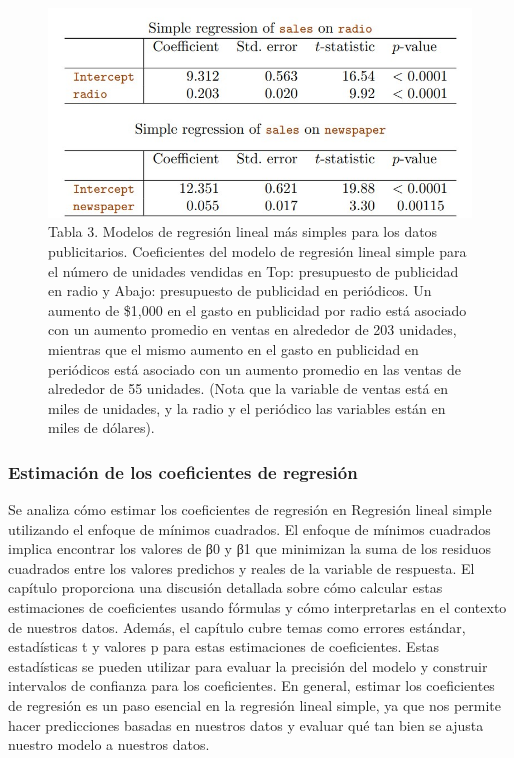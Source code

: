\documentclass[
  letterpaper,
  DIV=11,
  numbers=noendperiod]{scrartcl}
\begin{document}
\begin{figure}

{\centering \includegraphics{images/tbl 3.jpg}

}

\caption{Tabla 3. Modelos de regresión lineal más simples para los datos
publicitarios. Coeficientes del modelo de regresión lineal simple para
el número de unidades vendidas en Top: presupuesto de publicidad en
radio y Abajo: presupuesto de publicidad en periódicos. Un aumento de
\$1,000 en el gasto en publicidad por radio está asociado con un aumento
promedio en ventas en alrededor de 203 unidades, mientras que el mismo
aumento en el gasto en publicidad en periódicos está asociado con un
aumento promedio en las ventas de alrededor de 55 unidades. (Nota que la
variable de ventas está en miles de unidades, y la radio y el periódico
las variables están en miles de dólares).}

\end{figure}

\hypertarget{estimaciuxf3n-de-los-coeficientes-de-regresiuxf3n}{%
\subsubsection{Estimación de los coeficientes de
regresión}\label{estimaciuxf3n-de-los-coeficientes-de-regresiuxf3n}}

Se analiza cómo estimar los coeficientes de regresión en Regresión
lineal simple utilizando el enfoque de mínimos cuadrados. El enfoque de
mínimos cuadrados implica encontrar los valores de β0 y β1 que minimizan
la suma de los residuos cuadrados entre los valores predichos y reales
de la variable de respuesta. El capítulo proporciona una discusión
detallada sobre cómo calcular estas estimaciones de coeficientes usando
fórmulas y cómo interpretarlas en el contexto de nuestros datos. Además,
el capítulo cubre temas como errores estándar, estadísticas t y valores
p para estas estimaciones de coeficientes. Estas estadísticas se pueden
utilizar para evaluar la precisión del modelo y construir intervalos de
confianza para los coeficientes. En general, estimar los coeficientes de
regresión es un paso esencial en la regresión lineal simple, ya que nos
permite hacer predicciones basadas en nuestros datos y evaluar qué tan
bien se ajusta nuestro modelo a nuestros datos.
\end{document}
